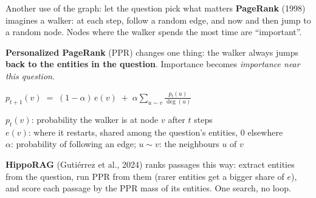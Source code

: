 \documentclass[aspectratio=169]{beamer}
\begin{document}
\begin{frame}{Another use of the graph: let the question pick what matters}
  \vspace{0.2em}
  \textbf{PageRank} (1998) imagines a walker: at each step, follow a random edge, and now and
  then jump to a random node. Nodes where the walker spends the most time are ``important''.

  \vspace{0.3em}
  \textbf{Personalized PageRank} (PPR) changes one thing: the walker always jumps \textbf{back
  to the entities in the question}. Importance becomes \emph{importance near this question}.

  \vspace{0.3em}
  \begin{center}
  \begin{tcolorbox}[colback=lightbg, colframe=popblue, boxrule=0.5pt, arc=2pt, width=0.86\textwidth]
  \centering
  $\displaystyle p_{t+1}(v) \;=\; (1-\alpha)\, e(v) \;+\; \alpha \sum_{u \sim v}
  \frac{p_t(u)}{\deg(u)}$

  \vspace{0.2em}
  \raggedright\small
  $p_t(v)$: probability the walker is at node $v$ after $t$ steps\\
  $e(v)$: where it restarts, shared among the question's entities, 0 elsewhere\\
  $\alpha$: probability of following an edge; $u \sim v$: the neighbours $u$ of $v$
  \end{tcolorbox}
  \end{center}

  \vspace{0.2em}
  {\small \textbf{HippoRAG} (Guti\'errez et al., 2024) ranks passages this way: extract entities
  from the question, run PPR from them (rarer entities get a bigger share of $e$), and score each
  passage by the PPR mass of its entities. One search, no loop.}
\end{frame}
\end{document}
